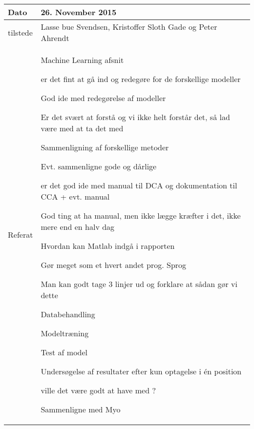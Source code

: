 \begin{center}
	\begin{tabular}{| l | p{10cm} |}
		\hline
		Dato		& 26. November 2015\\ \hline
		tilstede 	& Lasse bue Svendsen, Kristoffer Sloth Gade og Peter Ahrendt\\ \hline
		Referat		& \vspace{-5mm}\begin{myEnumerate}
			\item Machine Learning afsnit
			\begin{myItemize}				
				\item er det fint at gå ind og redegøre for de forskellige modeller
				\begin{myItemize}
					\item God ide med redegørelse af modeller
					\item Er det svært at forstå og vi ikke helt forstår det, så lad være med at ta det med
					\item Sammenligning af forskellige metoder
				\end{myItemize}
				\item Evt. sammenligne gode og dårlige
			\end{myItemize}
			\item er det god ide med manual til DCA og dokumentation til CCA + evt. manual
			\begin{myItemize}
				\item God ting at ha manual, men ikke lægge kræfter i det, ikke mere end en halv dag
			\end{myItemize}
			\item Hvordan kan Matlab indgå i rapporten
			\begin{myItemize}
				\item Gør meget som et hvert andet prog. Sprog
				\item Man kan godt tage 3 linjer ud og forklare at sådan gør vi dette
				\item Databehandling
				\item Modeltræning
				\item Test af model
			\end{myItemize}
			\item Undersøgelse af resultater efter kun optagelse i én position
			\begin{myItemize}
				\item ville det være godt at have med ?
				\item Sammenligne med Myo
			\end{myItemize}
		\end{myEnumerate}\\ 	
		\hline
	\end{tabular}
\end{center}

